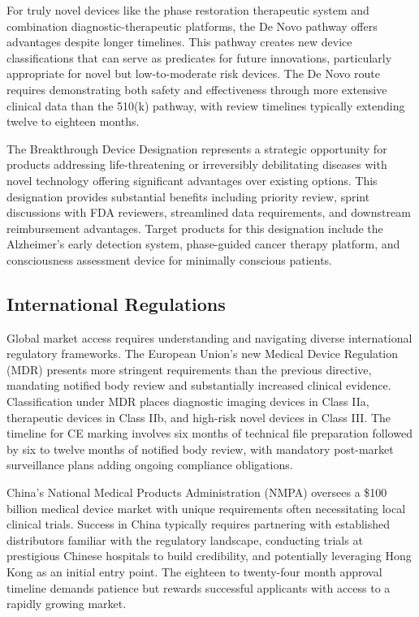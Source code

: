 \documentclass[12pt,a4paper]{report}
\begin{document}
For truly novel devices like the phase restoration therapeutic system and combination diagnostic-therapeutic platforms, the De Novo pathway offers advantages despite longer timelines. This pathway creates new device classifications that can serve as predicates for future innovations, particularly appropriate for novel but low-to-moderate risk devices. The De Novo route requires demonstrating both safety and effectiveness through more extensive clinical data than the 510(k) pathway, with review timelines typically extending twelve to eighteen months.

The Breakthrough Device Designation represents a strategic opportunity for products addressing life-threatening or irreversibly debilitating diseases with novel technology offering significant advantages over existing options. This designation provides substantial benefits including priority review, sprint discussions with FDA reviewers, streamlined data requirements, and downstream reimbursement advantages. Target products for this designation include the Alzheimer's early detection system, phase-guided cancer therapy platform, and consciousness assessment device for minimally conscious patients.

\subsection{International Regulations}

Global market access requires understanding and navigating diverse international regulatory frameworks. The European Union's new Medical Device Regulation (MDR) presents more stringent requirements than the previous directive, mandating notified body review and substantially increased clinical evidence. Classification under MDR places diagnostic imaging devices in Class IIa, therapeutic devices in Class IIb, and high-risk novel devices in Class III. The timeline for CE marking involves six months of technical file preparation followed by six to twelve months of notified body review, with mandatory post-market surveillance plans adding ongoing compliance obligations.

China's National Medical Products Administration (NMPA) oversees a \$100 billion medical device market with unique requirements often necessitating local clinical trials. Success in China typically requires partnering with established distributors familiar with the regulatory landscape, conducting trials at prestigious Chinese hospitals to build credibility, and potentially leveraging Hong Kong as an initial entry point. The eighteen to twenty-four month approval timeline demands patience but rewards successful applicants with access to a rapidly growing market.
\end{document}
